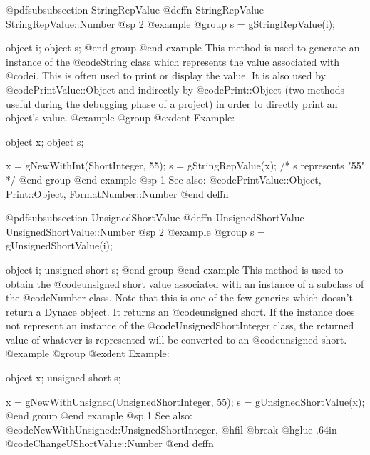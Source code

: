 @pdfsubsubsection {StringRepValue}
@deffn {StringRepValue} StringRepValue::Number
@sp 2
@example
@group
s = gStringRepValue(i);

object  i;
object  s;
@end group
@end example
This method is used to generate an instance of the @code{String} class
which represents the value associated with @code{i}.  This is often
used to print or display the value.  It is also used by
@code{PrintValue::Object} and indirectly by @code{Print::Object}
(two methods useful during the debugging phase of a project)
in order to directly print an object's value.
@example
@group
@exdent Example:

object  x;
object  s;

x = gNewWithInt(ShortInteger, 55);
s = gStringRepValue(x);      /*  s represents "55"   */
@end group
@end example
@sp 1
See also:  @code{PrintValue::Object, Print::Object, FormatNumber::Number}
@end deffn










@pdfsubsubsection {UnsignedShortValue}
@deffn {UnsignedShortValue} UnsignedShortValue::Number
@sp 2
@example
@group
s = gUnsignedShortValue(i);

object  i;
unsigned short  s;
@end group
@end example
This method is used to obtain the @code{unsigned short} value associated
with an instance of a subclass of the @code{Number} class.  Note that
this is one of the few generics which doesn't return a Dynace object.
It returns an @code{unsigned short}.  If the instance does not represent
an instance of the @code{UnsignedShortInteger} class, the returned value
of whatever is represented will be converted to an @code{unsigned short}.
@example
@group
@exdent Example:

object  x;
unsigned short  s;

x = gNewWithUnsigned(UnsignedShortInteger, 55);
s = gUnsignedShortValue(x);
@end group
@end example
@sp 1
See also:  @code{NewWithUnsigned::UnsignedShortInteger,}
@hfil @break @hglue .64in      @code{ChangeUShortValue::Number}
@end deffn










